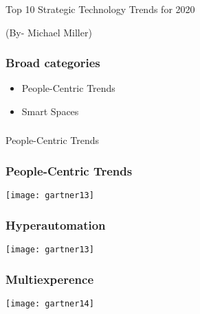 \begin{frame}[fragile]\frametitle{}
\begin{center}
{\Large Top 10 Strategic Technology Trends for 2020}
\end{center}

{\tiny (By- Michael Miller)}

\end{frame}


\begin{frame}[fragile]\frametitle{Broad categories}

\begin{itemize}
\item People-Centric Trends
\item Smart Spaces
\end{itemize}
\end{frame}

\begin{frame}[fragile]\frametitle{}
\begin{center}
{\Large People-Centric Trends}
\end{center}
\end{frame}

\begin{frame}[fragile]\frametitle{People-Centric Trends}
\begin{center}
\texttt{[image: gartner13]}
\end{center}
\end{frame}

\begin{frame}[fragile]\frametitle{Hyperautomation}
\begin{center}
\texttt{[image: gartner13]}
\end{center}
\end{frame}

\begin{frame}[fragile]\frametitle{Multiexperence}
\begin{center}
\texttt{[image: gartner14]}
\end{center}
\end{frame}

